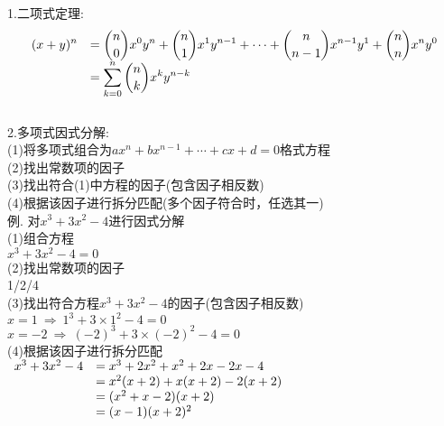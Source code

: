 \documentclass[UTF8,fontset=ubuntu]{ctexart}
\begin{document}
1.二项式定理:
\[\begin{array}{>{\displaystyle}r >{\displaystyle}l}
(x+y)^n & =\binom{n}{0}x^0y^n+\binom{n}{1}x^1y^{n-1}+\cdots+\binom{n}{n-1}x^{n-1}y^1+\binom{n}{n}x^ny^0\\
& =\sum_{k=0}^{n}\binom{n}{k}x^ky^{n-k}
\end{array}\]\\[2ex]

2.多项式因式分解:\\
(1)将多项式组合为$ax^n+bx^{n-1}+\cdots+cx+d=0$格式方程\\
(2)找出常数项的因子\\
(3)找出符合(1)中方程的因子(包含因子相反数)\\
(4)根据该因子进行拆分匹配(多个因子符合时，任选其一)\\[1ex]

例. 对$x^3+3x^2-4$进行因式分解\\
(1)组合方程\\
$x^3+3x^2-4=0$\\
(2)找出常数项的因子\\
1/2/4\\
(3)找出符合方程$x^3+3x^2-4$的因子(包含因子相反数)\\
$x=1\ \Rightarrow\ 1^3+3\times 1^2-4=0$\\
$x=-2\ \Rightarrow\ (-2)^3+3\times(-2)^2-4=0$\\
(4)根据该因子进行拆分匹配\\
$\begin{array}{r l}
x^3+3x^2-4 & =x^3+2x^2+x^2+2x-2x-4\\
& =x^2(x+2)+x(x+2)-2(x+2)\\
& =(x^2+x-2)(x+2)\\
& =(x-1)(x+2)^2
\end{array}$
\end{document}
